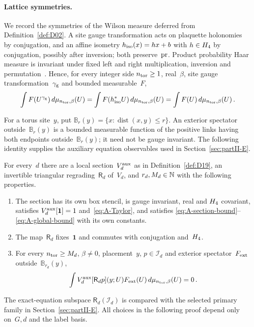 \paragraph{Lattice symmetries.} We record the symmetries of the Wilson measure deferred from Definition~\ref{def:D02}. A site gauge transformation acts on plaquette holonomies by conjugation, and an affine isometry $h_{\rm iso}(x)=hx+b$ with $h\in H_4$ by conjugation, possibly after inversion; both preserve~$\operatorname{pr}$. Product probability Haar measure is invariant under fixed left and right multiplication, inversion and permutation~\cite[Corollary~2.28 and Proposition~2.31]{Folland2015}. Hence, for every integer side $n_{\rm tor}\ge1$, real~$\beta$, site gauge transformation~$\gamma_{\rm g}$ and bounded measurable~$F$,
\begin{equation}\label{eq:A-Wilson-invariance}
\int F(U^{\gamma_{\rm g}})\,d\mu_{n_{\rm tor},\beta}(U)
=\int F(h_{\rm iso}^*U)\,d\mu_{n_{\rm tor},\beta}(U)
=\int F(U)\,d\mu_{n_{\rm tor},\beta}(U)\,.
\end{equation}

For a torus site~$y$, put $\mathbb B_r(y)=\{x:\operatorname{dist}(x,y)\le r\}$. An exterior spectator outside~$\mathbb B_r(y)$ is a bounded measurable function of the positive links having both endpoints outside~$\mathbb B_r(y)$; it need not be gauge invariant. The following identity supplies the auxiliary equation observables used in Section~\ref{sec:partII-E}.
\begin{lemma}\label{lem:A-R4}
For every~$d$ there are a local section~$V_d^{\rm aux}$ as in Definition~\ref{def:D19}, an invertible triangular regrading~$\mathsf R_d$ of~$V_d$, and $r_d,M_d\in\mathbb{N}$ with the following properties.
\begin{enumerate}[label=\textup{(\roman*)},nosep]
\item The section has its own box stencil, is gauge invariant, real and $H_4$ covariant, satisfies $V_d^{\rm aux}[\mathbf1]=1$ and~\eqref{eq:A-Taylor}, and satisfies \eqref{eq:A-section-bound}--\eqref{eq:A-global-bound} with its own constants.
\item The map~$\mathsf R_d$ fixes~$\mathbf1$ and commutes with conjugation and~$H_4$.
\item For every $n_{\rm tor}\ge M_d$, $\beta\ne0$, placement~$y$, $p\in\mathcal I_d$ and exterior spectator~$F_{\rm ext}$ outside~$\mathbb B_{r_d}(y)$,
\begin{equation}\label{eq:A-aux-zero}
\int V_d^{\rm aux}[\mathsf R_dp](y;U)F_{\rm ext}(U)\,d\mu_{n_{\rm tor},\beta}(U)=0\,.
\end{equation}
\end{enumerate}
\end{lemma}
The exact-equation subspace $\mathsf R_d(\mathcal I_d)$ is compared with the selected primary family in Section~\ref{sec:partII-E}. All choices in the following proof depend only on~$G,d$ and the label basis.

